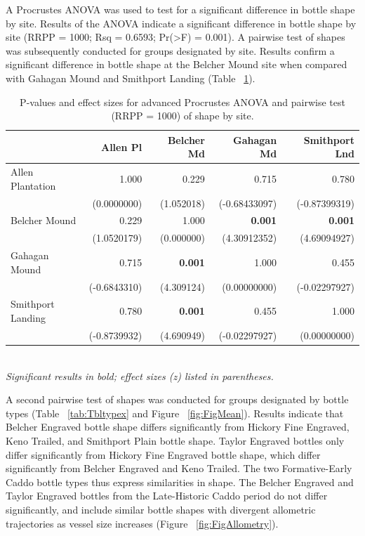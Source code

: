 \documentclass[review]{elsarticle}
\begin{document}
A Procrustes ANOVA was used to test for a significant difference in bottle shape by site. Results of the ANOVA indicate a significant difference in bottle shape by site (RRPP = 1000; Rsq = 0.6593; Pr(>F) = 0.001). A pairwise test of shapes was subsequently conducted for groups designated by site. Results confirm a significant difference in bottle shape at the Belcher Mound site when compared with Gahagan Mound and Smithport Landing (Table ~\ref{tab:Tbl3x}).

\begin{table}[htbp]\centering
\footnotesize
\caption{P-values and effect sizes for advanced Procrustes ANOVA and pairwise test (RRPP = 1000) of shape by site.}
\centering
\begin{tabular}{lrrrr}
\toprule
 & Allen Pl & Belcher Md & Gahagan Md & Smithport Lnd\\
\midrule
Allen Plantation & 1.000 & 0.229 & 0.715 & 0.780\\
 & (0.0000000) & (1.052018) & (-0.68433097) & (-0.87399319)\\
Belcher Mound & 0.229 & 1.000 & \textbf{0.001} & \textbf{0.001}\\
 & (1.0520179) & (0.000000) & (4.30912352) & (4.69094927)\\
Gahagan Mound & 0.715 & \textbf{0.001} & 1.000 & 0.455\\
 & (-0.6843310) & (4.309124) & (0.00000000) & (-0.02297927)\\
Smithport Landing & 0.780 & \textbf{0.001} & 0.455 & 1.000\\
 & (-0.8739932) & (4.690949) & (-0.02297927) & (0.00000000)\\
\bottomrule
\end{tabular}\\
\smallskip
\textit{Significant results in bold; effect sizes (z) listed in parentheses.}
\label{tab:Tbl3x}
\end{table}

A second pairwise test of shapes was conducted for groups designated by bottle types (Table ~\ref{tab:Tbltypex} and Figure ~\ref{fig:FigMean}). Results indicate that Belcher Engraved bottle shape differs significantly from  Hickory Fine Engraved, Keno Trailed, and Smithport Plain bottle shape. Taylor Engraved bottles only differ significantly from Hickory Fine Engraved bottle shape, which differ significantly from Belcher Engraved and Keno Trailed. The two Formative-Early Caddo bottle types thus express similarities in shape. The Belcher Engraved and Taylor Engraved bottles from the Late-Historic Caddo period do not differ significantly, and include similar bottle shapes with divergent allometric trajectories as vessel size increases (Figure ~\ref{fig:FigAllometry}).
\end{document}
